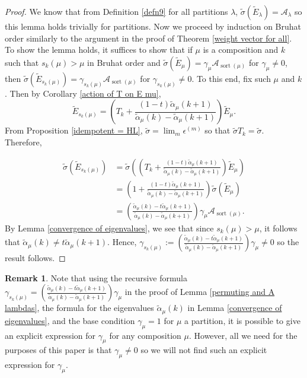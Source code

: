 \documentclass[11pt]{article}
\theoremstyle{definition}
\newtheorem{rema}[theo]{Remark}
\numberwithin{equation}{section}
\DeclareMathOperator{\sort}{sort}
\begin{document}
\begin{proof}

We know that from Definition \ref{defn9} for all partitions $\lambda$,  $\widetilde{\sigma}( \widetilde{E}_{\lambda} ) = \mathcal{A}_{\lambda}$ so this lemma holds trivially for partitions. Now we proceed by induction on Bruhat order similarly to the argument in the proof of Theorem \ref{weight vector for all}. To show the lemma holds, it suffices to show that if $\mu$ is a composition and $k$ such that $s_k(\mu) > \mu$ in Bruhat order and $\widetilde{\sigma}( \widetilde{E}_{\mu} ) = \gamma_{\mu} \mathcal{A}_{\sort(\mu)}$ for $\gamma_{\mu} \neq 0$, then $\widetilde{\sigma}( \widetilde{E}_{s_k(\mu)} ) = \gamma_{s_k(\mu)} \mathcal{A}_{\sort(\mu)}$ for $\gamma_{s_k(\mu)} \neq 0$. To this end, fix such $\mu$ and $k$. Then by Corollary \ref{action of T on E mu},
$$\widetilde{E}_{s_k(\mu)} = \left( T_k + \frac{(1-t)\widetilde{\alpha}_{\mu}(k+1)}{\widetilde{\alpha}_{\mu}(k)- \widetilde{\alpha}_{\mu}(k+1)}\right) \widetilde{E}_{\mu}.$$
From Proposition \ref{idempotent = HL}, $\widetilde{\sigma} = \lim_{m} \epsilon^{(m)}$ so that $\widetilde{\sigma}T_k = \widetilde{\sigma}$. Therefore, 

\begin{align*}
    \widetilde{\sigma}(\widetilde{E}_{s_k(\mu)})&= \widetilde{\sigma}\left( \left( T_k + \frac{(1-t)\widetilde{\alpha}_{\mu}(k+1)}{\widetilde{\alpha}_{\mu}(k)- \widetilde{\alpha}_{\mu}(k+1)}\right) \widetilde{E}_{\mu} \right) \\
    &= \left(1+ \frac{(1-t)\widetilde{\alpha}_{\mu}(k+1)}{\widetilde{\alpha}_{\mu}(k)- \widetilde{\alpha}_{\mu}(k+1)} \right) \widetilde{\sigma}(\widetilde{E}_{\mu}) \\
    &= \left( \frac{\widetilde{\alpha}_{\mu}(k) - t \widetilde{\alpha}_{\mu}(k+1)}{\widetilde{\alpha}_{\mu}(k) - \widetilde{\alpha}_{\mu}(k+1)} \right) \gamma_{\mu} \mathcal{A}_{\sort(\mu)}.
\end{align*}
By Lemma \ref{convergence of eigenvalues}, we see that since $s_k(\mu) > \mu$, it follows that $\widetilde{\alpha}_{\mu}(k) \neq t \widetilde{\alpha}_{\mu}(k+1).$
Hence, $\gamma_{s_k(\mu)} := \left( \frac{\widetilde{\alpha}_{\mu}(k) - t \widetilde{\alpha}_{\mu}(k+1)}{\widetilde{\alpha}_{\mu}(k) - \widetilde{\alpha}_{\mu}(k+1)} \right) \gamma_{\mu} \neq 0$ so the result follows.
\end{proof}

\begin{rema}
    Note that using the recursive formula $\gamma_{s_k(\mu)} = \left( \frac{\widetilde{\alpha}_{\mu}(k) - t \widetilde{\alpha}_{\mu}(k+1)}{\widetilde{\alpha}_{\mu}(k) - \widetilde{\alpha}_{\mu}(k+1)} \right) \gamma_{\mu}$ in the proof of Lemma \ref{permuting and A lambdas}, the formula for the eigenvalues $\widetilde{\alpha}_{\mu}(k)$ in Lemma \ref{convergence of eigenvalues}, and the base condition $\gamma_{\mu} = 1$ for $\mu$ a partition, it is possible to give an explicit expression for $\gamma_{\mu}$ for any composition $\mu.$ However, all we need for the purposes of this paper is that $\gamma_{\mu} \neq 0$ so we will not find such an explicit expression for $\gamma_{\mu}.$
\end{rema}
\end{document}
